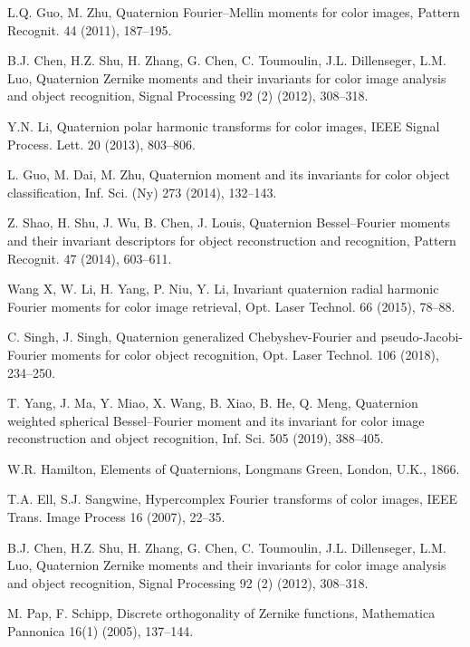 \documentclass[12pt]{article}
\begin{document}
\begin{thebibliography}{99}

L.Q. Guo, M. Zhu,
Quaternion Fourier--Mellin moments for color images,
Pattern Recognit. 44 (2011), 187--195.

B.J. Chen, H.Z. Shu, H. Zhang, G. Chen, C. Toumoulin, J.L. Dillenseger, L.M. Luo, Quaternion Zernike moments and their invariants for color image analysis and object recognition, Signal Processing 92 (2) (2012), 308--318.

Y.N. Li,
Quaternion polar harmonic transforms for color images,
IEEE Signal Process. Lett. 20 (2013), 803--806.

L. Guo, M. Dai, M. Zhu,
Quaternion moment and its invariants for color object classification,
Inf. Sci. (Ny) 273 (2014), 132--143.

Z. Shao, H. Shu, J. Wu, B. Chen, J. Louis,
Quaternion Bessel--Fourier moments and their invariant descriptors for object reconstruction and recognition,
Pattern Recognit. 47 (2014), 603--611.

Wang X, W. Li, H. Yang, P. Niu, Y. Li,  Invariant quaternion radial harmonic Fourier moments for color image retrieval,
Opt. Laser Technol. 66 (2015), 78--88.

C. Singh, J. Singh,
Quaternion generalized Chebyshev-Fourier and pseudo-Jacobi-Fourier moments for color object recognition,
Opt. Laser Technol. 106 (2018), 234--250.

T. Yang, J. Ma, Y. Miao, X. Wang, B. Xiao, B. He, Q. Meng, 
Quaternion weighted spherical Bessel--Fourier moment and its invariant for color image reconstruction and object recognition, 
Inf. Sci. 505 (2019), 388--405.

W.R. Hamilton, Elements of Quaternions, Longmans Green, London, U.K., 1866.

T.A. Ell, S.J. Sangwine, Hypercomplex Fourier transforms of color images, IEEE Trans. Image Process 16 (2007), 22--35.

B.J. Chen, H.Z. Shu, H. Zhang, G. Chen, C. Toumoulin, J.L. Dillenseger, L.M. Luo, Quaternion Zernike moments and their invariants for color image analysis and object recognition, Signal Processing 92 (2) (2012), 308--318.

M. Pap, F. Schipp, Discrete orthogonality of Zernike functions, Mathematica Pannonica 16(1) (2005), 137--144.


\end{thebibliography}
\end{document}
